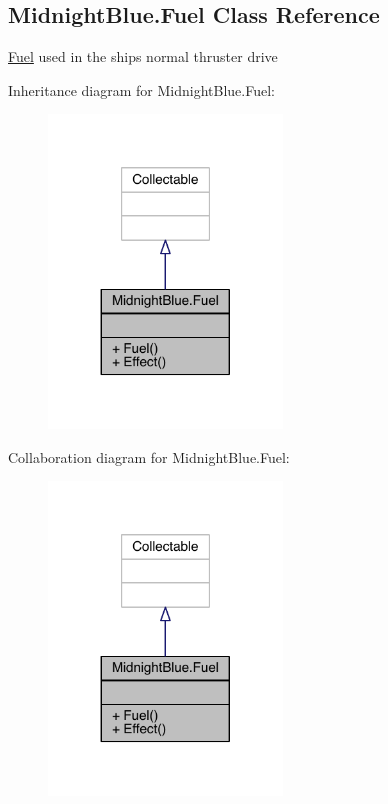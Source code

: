 \hypertarget{class_midnight_blue_1_1_fuel}{}\subsection{Midnight\+Blue.\+Fuel Class Reference}
\label{class_midnight_blue_1_1_fuel}


\hyperlink{class_midnight_blue_1_1_fuel}{Fuel} used in the ships normal thruster drive  




Inheritance diagram for Midnight\+Blue.\+Fuel\+:\nopagebreak
\begin{figure}[H]
\begin{center}
\leavevmode
\includegraphics[width=176pt]{class_midnight_blue_1_1_fuel__inherit__graph}
\end{center}
\end{figure}


Collaboration diagram for Midnight\+Blue.\+Fuel\+:\nopagebreak
\begin{figure}[H]
\begin{center}
\leavevmode
\includegraphics[width=176pt]{class_midnight_blue_1_1_fuel__coll__graph}
\end{center}
\end{figure}
